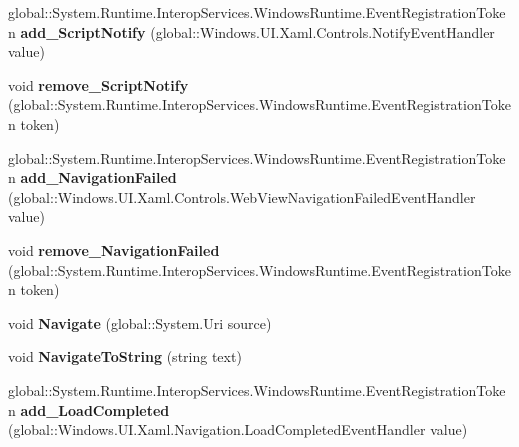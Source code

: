 \begin{DoxyCompactItemize}
global\+::\+System.\+Runtime.\+Interop\+Services.\+Windows\+Runtime.\+Event\+Registration\+Token {\bfseries add\+\_\+\+Script\+Notify} (global\+::\+Windows.\+U\+I.\+Xaml.\+Controls.\+Notify\+Event\+Handler value)
\item 
\mbox{\label{interface_windows_1_1_u_i_1_1_xaml_1_1_controls_1_1_i_web_view_a9bb7e1887eef12d9c592c4b27677ac47}} 
void {\bfseries remove\+\_\+\+Script\+Notify} (global\+::\+System.\+Runtime.\+Interop\+Services.\+Windows\+Runtime.\+Event\+Registration\+Token token)
\item 
\mbox{\label{interface_windows_1_1_u_i_1_1_xaml_1_1_controls_1_1_i_web_view_ac5c8918c61695196369083e55461e2ae}} 
global\+::\+System.\+Runtime.\+Interop\+Services.\+Windows\+Runtime.\+Event\+Registration\+Token {\bfseries add\+\_\+\+Navigation\+Failed} (global\+::\+Windows.\+U\+I.\+Xaml.\+Controls.\+Web\+View\+Navigation\+Failed\+Event\+Handler value)
\item 
\mbox{\label{interface_windows_1_1_u_i_1_1_xaml_1_1_controls_1_1_i_web_view_a2701e74fa38f2b8566ba2ded21b4f20f}} 
void {\bfseries remove\+\_\+\+Navigation\+Failed} (global\+::\+System.\+Runtime.\+Interop\+Services.\+Windows\+Runtime.\+Event\+Registration\+Token token)
\item 
\mbox{\label{interface_windows_1_1_u_i_1_1_xaml_1_1_controls_1_1_i_web_view_ad6b51d8da7bbcb753718bf0fbdf993e9}} 
void {\bfseries Navigate} (global\+::\+System.\+Uri source)
\item 
\mbox{\label{interface_windows_1_1_u_i_1_1_xaml_1_1_controls_1_1_i_web_view_a5d3ada22753e211f63167cbea88d12f7}} 
void {\bfseries Navigate\+To\+String} (string text)
\item 
\mbox{\label{interface_windows_1_1_u_i_1_1_xaml_1_1_controls_1_1_i_web_view_a13cd0995f18f6d179d71abd176ff1dba}} 
global\+::\+System.\+Runtime.\+Interop\+Services.\+Windows\+Runtime.\+Event\+Registration\+Token {\bfseries add\+\_\+\+Load\+Completed} (global\+::\+Windows.\+U\+I.\+Xaml.\+Navigation.\+Load\+Completed\+Event\+Handler value)

\end{DoxyCompactItemize}
